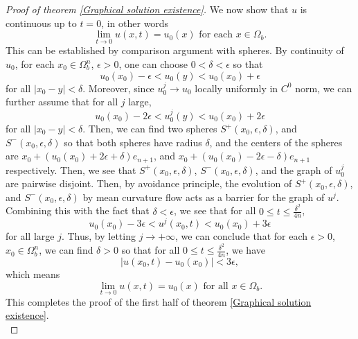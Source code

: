 \documentclass[pdflatex,sn-mathphys-num]{sn-jnl}%
\begin{document}
\begin{proof}[Proof of theorem \ref{Graphical solution existence}]
We now show that $u$ is continuous up to $t = 0$, in other words 
\begin{equation}
    \lim_{t \to 0}u(x,t) = u_0(x) \text{ for each }x \in \Omega_b.
\end{equation}
This can be established by comparison argument with spheres. By continuity of $u_0$, for each $x_0 \in \Omega^n_b$, $\epsilon > 0$, one can choose $0 < \delta < \epsilon$ so that 
\begin{equation}
    u_0(x_0) - \epsilon < u_0(y) < u_0(x_0) + \epsilon
\end{equation}
for all $|x_0 - y| < \delta$. 
Moreover, since $u^j_0 \to u_0$ locally uniformly in $C^0$ norm, we can further assume that for all $j$ large, 
\begin{equation}
     u_0(x_0) - 2\epsilon < u_0^j(y) < u_0(x_0) + 2\epsilon
\end{equation}
for all $|x_0 - y| < \delta$. Then, we can find two spheres $S^+(x_0, \epsilon, \delta)$, and $S^-(x_0, \epsilon, \delta)$ so that both spheres have radius $\delta$, and the centers of the spheres are $x_0 + (u_0(x_0) + 2\epsilon + \delta)e_{n+1}$, and $x_0 + (u_0(x_0) - 2\epsilon - \delta)e_{n+1}$ respectively. Then, we see that $S^+(x_0, \epsilon, \delta)$, $S^-(x_0, \epsilon, \delta)$, and the graph of $u^j_0$ are pairwise disjoint. Then, by avoidance principle, the evolution of $S^+(x_0, \epsilon, \delta)$, and $S^-(x_0, \epsilon, \delta)$ by mean curvature flow acts as a barrier for the graph of $u^j$. Combining this with the fact that $\delta < \epsilon$, we see that for all $0 \leq t \leq \frac{\delta^2}{4n}$, 
\begin{equation}
    u_0(x_0) - 3\epsilon < u^j(x_0, t) < u_0(x_0) + 3\epsilon
\end{equation}
for all large $j$. Thus, by letting $j \to + \infty$, we can conclude that for each $\epsilon > 0$, $x_0\in \Omega^n_b$, we can find $\delta > 0$ so that for all $0 \leq t \leq \frac{\delta^2}{4n}$, we have
\begin{equation}
    |u(x_0, t) - u_0(x_0)| < 3\epsilon,
\end{equation}
which means 
\begin{equation}
    \lim_{t \to 0}u(x, t) = u_0(x) \text{ for all }x \in \Omega_b.
\end{equation}
This completes the proof of the first half of theorem \ref{Graphical solution existence}.\\


\end{proof}
\end{document}

